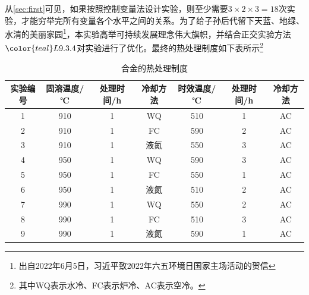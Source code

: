从\ref{sec:first}可见，如果按照控制变量法设计实验，则至少需要$3\times2\times3  =18$次实验，才能穷举完所有变量各个水平之间的关系。为了给子孙后代留下天蓝、地绿、水清的美丽家园\footnote{出自2022年6月5日，习近平致2022年六五环境日国家主场活动的贺信}，本实验高举可持续发展理念伟大旗帜，并结合正交实验方法$\color{teal} L9.3.4 $对实验进行了优化。最终的热处理制度如下表所示\footnote{其中WQ表示水冷、FC表示炉冷、AC表示空冷。}
\begin{table}[htbp]
	\centering
	\caption{\ti 合金的热处理制度}
	\label{sec:myHT}
\begin{tabular}{ccccccc}
	\toprule
		实验编号&固溶温度/℃ &处理时间/h & 冷却方法 & 时效温度/℃  &处理时间/h & 冷却方法 \\
	\midrule
	1 & 910 & 1 & WQ & 510 & 1 & AC \\
	2 & 910 & 1 & FC & 590 & 2 & AC \\
	3 & 910 & 1 & 液氮 & 550 & 3 & AC \\
	4 & 950 & 1 & WQ & 590 & 3 & AC \\
	5 & 950 & 1 & FC & 550 & 1 & AC \\
	6 & 950 & 1 & 液氮 & 510 & 2 & AC \\
	7 & 990 & 1 & WQ & 550 & 2 & AC \\
	8 & 990 & 1 & FC & 510 & 3 & AC \\
	9 & 990 & 1 & 液氮 & 590 & 1 & AC \\
	\bottomrule
\end{tabular}
\end{table}

